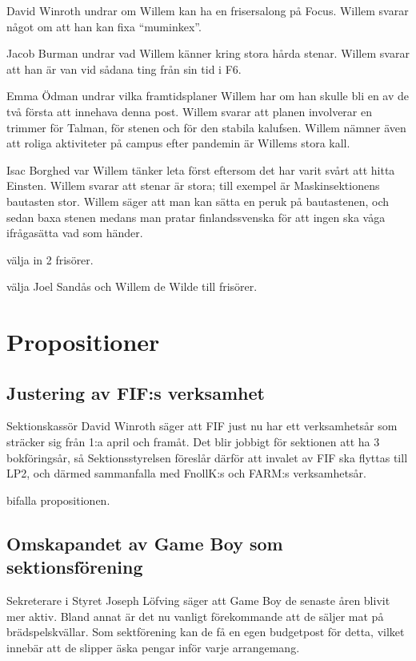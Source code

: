 \documentclass[hidelinks]{sektionsmote}
\begin{document}
David Winroth undrar om Willem kan ha en frisersalong på Focus.
Willem svarar något om att han kan fixa \enquote{muminkex}.

Jacob Burman undrar vad Willem känner kring stora hårda stenar.
Willem svarar att han är van vid sådana ting från sin tid i F6.

Emma Ödman undrar vilka framtidsplaner Willem har om han skulle bli en av de två första att innehava denna post.
Willem svarar att planen involverar en trimmer för Talman, för stenen och för den stabila kalufsen.
Willem nämner även att roliga aktiviteter på campus efter pandemin är Willems stora kall.

Isac Borghed var Willem tänker leta först eftersom det har varit svårt att hitta Einsten.
Willem svarar att stenar är stora; till exempel är Maskinsektionens bautasten stor.
Willem säger att man kan sätta en peruk på bautastenen, och sedan baxa stenen medans man pratar finlandssvenska för att ingen ska våga ifrågasätta vad som händer.

\begin{beslut}
  \item välja in 2 frisörer.
  \item välja Joel Sandås och Willem de Wilde till frisörer.
\end{beslut}


\section{Propositioner}
\subsection{Justering av FIF:s verksamhet}
Sektionskassör David Winroth säger att FIF just nu har ett verksamhetsår som sträcker sig från 1:a april och framåt.
Det blir jobbigt för sektionen att ha 3 bokföringsår, så Sektionsstyrelsen föreslår därför att invalet av FIF ska flyttas till LP2, och därmed sammanfalla med FnollK:s och FARM:s verksamhetsår.

\begin{beslut}
  \item bifalla propositionen.
\end{beslut}


\subsection{Omskapandet av Game Boy som sektionsförening}
Sekreterare i Styret Joseph Löfving säger att Game Boy de senaste åren blivit mer aktiv.
Bland annat är det nu vanligt förekommande att de säljer mat på brädspelskvällar.
Som sektförening kan de få en egen budgetpost för detta, vilket innebär att de slipper äska pengar inför varje arrangemang.
\end{document}
